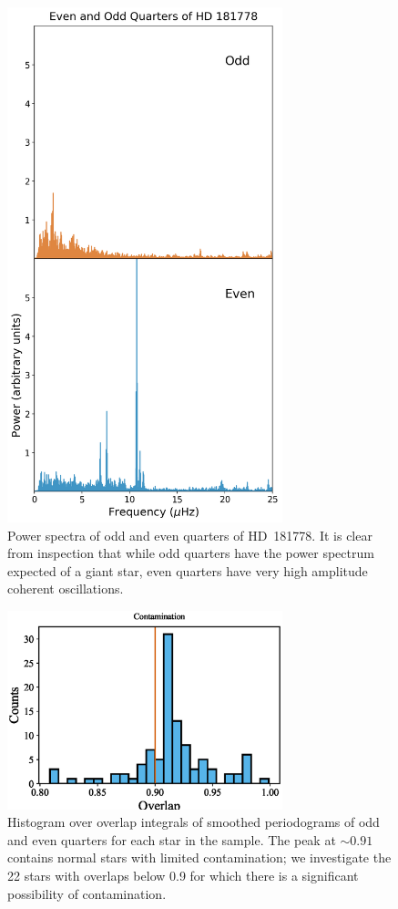 \documentclass[a4paper,fleqn,usenatbib]{mnras}
\begin{document}
\begin{figure}
\noindent\includegraphics[width=8cm,keepaspectratio]{contam_HD_181778.png}

\caption{\label{contamination}
Power spectra of odd and even quarters of HD~181778. It is clear from inspection that while odd quarters have the power spectrum expected of a giant star, even quarters have very high amplitude coherent oscillations.}
\end{figure}


\begin{figure}
\noindent\includegraphics[width=8cm,keepaspectratio]{contam.eps}

\caption{\label{contamination2}
Histogram over overlap integrals of smoothed periodograms of odd and even quarters for each star in the sample. The peak at $\sim 0.91$ contains normal stars with limited contamination; we investigate the 22 stars with overlaps below 0.9 for which there is a significant possibility of contamination.}
\end{figure}
\end{document}
